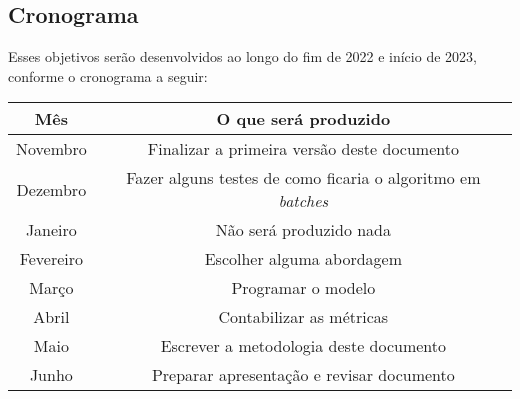 \subsection{Cronograma}

Esses objetivos serão desenvolvidos ao longo do fim de 2022 e início de 2023, conforme o 
cronograma a seguir:

\begin{center}
    \begin{tabular}{|c|c|}
        \hline
        Mês & O que será produzido \\
        \hline
        Novembro & Finalizar a primeira versão deste documento \\
        \hline
        Dezembro & Fazer alguns testes de como ficaria o algoritmo em \emph{batches} \\
        \hline
        Janeiro & Não será produzido nada \\
        \hline 
        Fevereiro & Escolher alguma abordagem \\
        \hline
        Março & Programar o modelo \\
        \hline
        Abril & Contabilizar as métricas \\
        \hline
        Maio & Escrever a metodologia deste documento \\
        \hline
        Junho & Preparar apresentação e revisar documento \\
        \hline
    \end{tabular}
\end{center}